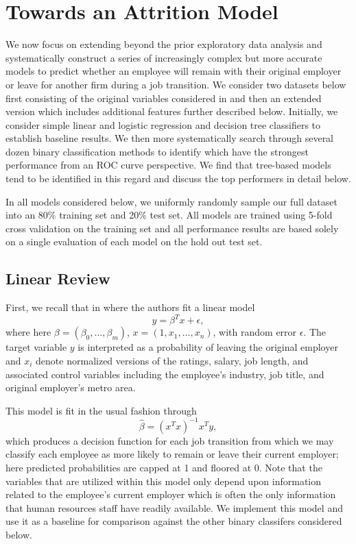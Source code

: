 \documentclass[10pt]{article}
\begin{document}
\section{Towards an Attrition Model}\label{modsec}

We now focus on extending beyond the prior exploratory data analysis and systematically construct 
a series of increasingly complex but more accurate 
models to predict whether an employee will remain with their original employer or 
leave for another firm during a job transition.  We consider two datasets below first 
consisting of the original variables considered in \cite{Smart2016} and then an extended 
version which includes additional features further described below. Initially, we 
consider simple linear and logistic regression and decision tree classifiers to establish 
baseline results.  We then more systematically search through several dozen binary classification 
methods to identify which have the strongest performance from an ROC curve perspective.  We find 
that tree-based models tend to be identified in this regard and discuss the top performers 
in detail below. 

In all models considered below, we uniformly randomly sample our full dataset into an 80\% training set 
and 20\% test set.  All models are trained using 5-fold cross validation on the training set and all performance 
results are based solely on a single evaluation of each model on the hold out test set.  

\subsection{Linear Review}
First, we recall that in \cite{Smart2016} where the authors fit a linear model 
%
\begin{equation} 
    y = \beta^Tx + \epsilon, 
\end{equation} 
% 
where here $\beta = (\beta_0,\ldots,\beta_m)$, $x=(1,x_1,\ldots,x_{n})$, with random 
error $\epsilon$. The 
target variable $y$ is interpreted as a probability of leaving the original employer and 
$x_i$ denote normalized versions of the ratings, salary, job length, and 
associated control variables including the employee's industry, job title, and original 
employer's metro area.

This model is fit in the usual fashion through 
%
\begin{equation}
    \hat{\beta} = (x^Tx)^{-1}x^Ty,
\end{equation}
%
which produces a decision function for each job transition from which we may classify 
each employee as more likely to remain or leave their current employer; here predicted probabilities 
are capped at 1 and floored at 0. Note that the variables 
that are utilized within this model only depend upon information related to the employee's 
current employer which is often the only information that human resources staff have 
readily available.  We implement this model and use it as a baseline for comparison against the other
binary classifers considered below. 
\end{document}

